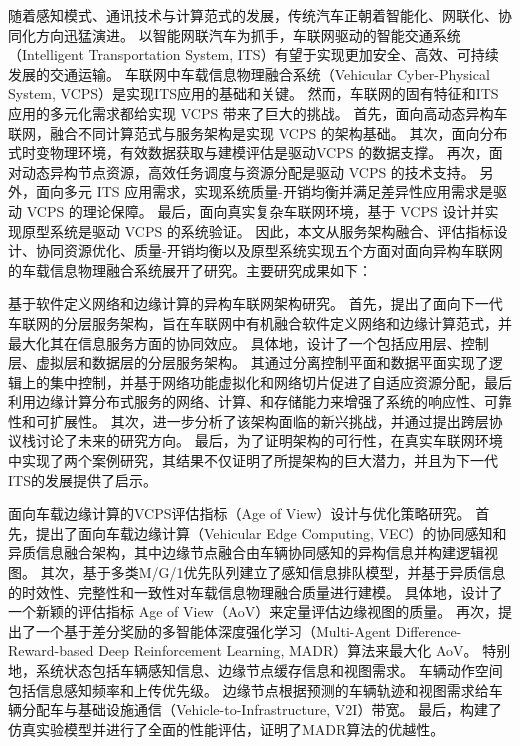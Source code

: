 \begin{cabstract}	%

随着感知模式、通讯技术与计算范式的发展，传统汽车正朝着智能化、网联化、协同化方向迅猛演进。
以智能网联汽车为抓手，车联网驱动的智能交通系统（Intelligent Transportation System, ITS）有望于实现更加安全、高效、可持续发展的交通运输。
车联网中车载信息物理融合系统（Vehicular Cyber-Physical System, VCPS）是实现ITS应用的基础和关键。
然而，车联网的固有特征和ITS应用的多元化需求都给实现 VCPS 带来了巨大的挑战。
首先，面向高动态异构车联网，融合不同计算范式与服务架构是实现 VCPS 的架构基础。
其次，面向分布式时变物理环境，有效数据获取与建模评估是驱动VCPS 的数据支撑。
再次，面对动态异构节点资源，高效任务调度与资源分配是驱动 VCPS 的技术支持。
另外，面向多元 ITS 应用需求，实现系统质量-开销均衡并满足差异性应用需求是驱动 VCPS 的理论保障。
最后，面向真实复杂车联网环境，基于 VCPS 设计并实现原型系统是驱动 VCPS 的系统验证。
因此，本文从服务架构融合、评估指标设计、协同资源优化、质量-开销均衡以及原型系统实现五个方面对面向异构车联网的车载信息物理融合系统展开了研究。主要研究成果如下：

 基于软件定义网络和边缘计算的异构车联网架构研究。
首先，提出了面向下一代车联网的分层服务架构，旨在车联网中有机融合软件定义网络和边缘计算范式，并最大化其在信息服务方面的协同效应。
具体地，设计了一个包括应用层、控制层、虚拟层和数据层的分层服务架构。
其通过分离控制平面和数据平面实现了逻辑上的集中控制，并基于网络功能虚拟化和网络切片促进了自适应资源分配，最后利用边缘计算分布式服务的网络、计算、和存储能力来增强了系统的响应性、可靠性和可扩展性。
其次，进一步分析了该架构面临的新兴挑战，并通过提出跨层协议栈讨论了未来的研究方向。
最后，为了证明架构的可行性，在真实车联网环境中实现了两个案例研究，其结果不仅证明了所提架构的巨大潜力，并且为下一代ITS的发展提供了启示。

 面向车载边缘计算的VCPS评估指标（Age of View）设计与优化策略研究。
首先，提出了面向车载边缘计算（Vehicular Edge Computing, VEC）的协同感知和异质信息融合架构，其中边缘节点融合由车辆协同感知的异构信息并构建逻辑视图。
其次，基于多类M/G/1优先队列建立了感知信息排队模型，并基于异质信息的时效性、完整性和一致性对车载信息物理融合质量进行建模。
具体地，设计了一个新颖的评估指标 Age of View（AoV）来定量评估边缘视图的质量。 
再次，提出了一个基于差分奖励的多智能体深度强化学习（Multi-Agent Difference-Reward-based Deep Reinforcement Learning, MADR）算法来最大化 AoV。
特别地，系统状态包括车辆感知信息、边缘节点缓存信息和视图需求。
车辆动作空间包括信息感知频率和上传优先级。
边缘节点根据预测的车辆轨迹和视图需求给车辆分配车与基础设施通信（Vehicle-to-Infrastructure, V2I）带宽。
最后，构建了仿真实验模型并进行了全面的性能评估，证明了MADR算法的优越性。


\end{cabstract}
